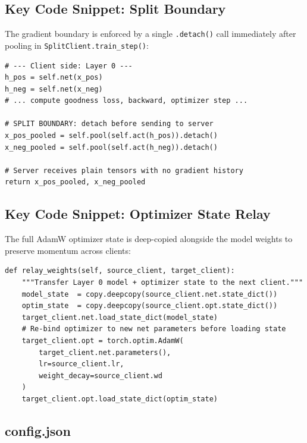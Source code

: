 \documentclass[12pt]{article}
\begin{document}
\subsection{Key Code Snippet: Split Boundary}

The gradient boundary is enforced by a single \texttt{.detach()} call immediately after
pooling in \texttt{SplitClient.train\_step()}:

\begin{lstlisting}[caption={Split boundary in SplitClient (SCFF\_CIFAR\_Split.py)},
                   label={lst:split}]
# --- Client side: Layer 0 ---
h_pos = self.net(x_pos)
h_neg = self.net(x_neg)
# ... compute goodness loss, backward, optimizer step ...

# SPLIT BOUNDARY: detach before sending to server
x_pos_pooled = self.pool(self.act(h_pos)).detach()
x_neg_pooled = self.pool(self.act(h_neg)).detach()

# Server receives plain tensors with no gradient history
return x_pos_pooled, x_neg_pooled
\end{lstlisting}

\subsection{Key Code Snippet: Optimizer State Relay}

The full AdamW optimizer state is deep-copied alongside the model weights to preserve momentum
across clients:

\begin{lstlisting}[caption={Optimizer state relay in MultiClientTrainer
                             (SCFF\_CIFAR\_MultiClient.py)},
                   label={lst:relay}]
def relay_weights(self, source_client, target_client):
    """Transfer Layer 0 model + optimizer state to the next client."""
    model_state  = copy.deepcopy(source_client.net.state_dict())
    optim_state  = copy.deepcopy(source_client.opt.state_dict())
    target_client.net.load_state_dict(model_state)
    # Re-bind optimizer to new net parameters before loading state
    target_client.opt = torch.optim.AdamW(
        target_client.net.parameters(),
        lr=source_client.lr,
        weight_decay=source_client.wd
    )
    target_client.opt.load_state_dict(optim_state)
\end{lstlisting}

\subsection{config.json}
\end{document}
